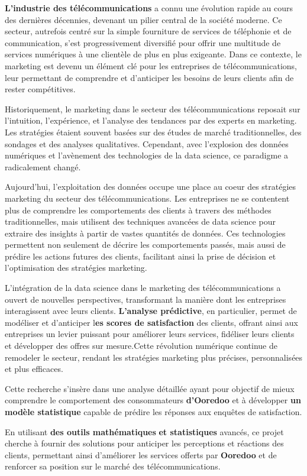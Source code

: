 \textbf{L'industrie des télécommunications} a connu une évolution rapide au cours des dernières décennies, devenant un pilier central de la société moderne. Ce secteur, autrefois centré sur la simple fourniture de services de téléphonie et de communication, s'est progressivement diversifié pour offrir une multitude de services numériques à une clientèle de plus en plus exigeante. Dans ce contexte, le marketing est devenu un élément clé pour les entreprises de télécommunications, leur permettant de comprendre et d'anticiper les besoins de leurs clients afin de rester compétitives.\par

Historiquement, le marketing dans le secteur des télécommunications reposait sur l'intuition, l'expérience, et l'analyse des tendances par des experts en marketing. Les stratégies étaient souvent basées sur des études de marché traditionnelles, des sondages et des analyses qualitatives. Cependant, avec l'explosion des données numériques et l'avènement des technologies de la data science, ce paradigme a radicalement changé.\par
Aujourd'hui, l'exploitation des données occupe une place au coeur des stratégies marketing du secteur des télécommunications. Les entreprises ne se contentent plus de comprendre les comportements des clients à travers des méthodes traditionnelles, mais utilisent des techniques avancées de data science pour extraire des insights à partir de vastes quantités de données. Ces technologies permettent non seulement de décrire les comportements passés, mais aussi de prédire les actions futures des clients, facilitant ainsi la prise de décision et l'optimisation des stratégies marketing.

L'intégration de la data science dans le marketing des télécommunications a ouvert de nouvelles perspectives, transformant la manière dont les entreprises interagissent avec leurs clients. \textbf{L'analyse prédictive}, en particulier, permet de modéliser et d'anticiper l\textbf{es scores de satisfaction} des clients, offrant ainsi aux entreprises un levier puissant pour améliorer leurs services, fidéliser leurs clients et développer des offres sur mesure.Cette révolution numérique continue de remodeler le secteur, rendant les stratégies marketing plus précises, personnalisées et plus efficaces.\par

Cette recherche s'insère dans une analyse détaillée ayant pour objectif de mieux comprendre le comportement des consommateurs \textbf{d'Ooredoo} et à développer \textbf{un modèle statistique} capable de prédire les réponses aux enquêtes de satisfaction. \par

En utilisant \textbf{des outils mathématiques} \textbf{et statistiques} avancés, ce projet cherche à fournir des solutions pour anticiper les perceptions et réactions des clients, permettant ainsi d'améliorer les services offerts par \textbf{Ooredoo }et de renforcer sa position sur le marché des télécommunications. 

 








